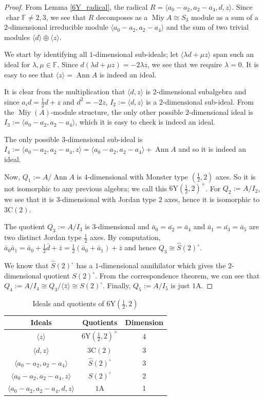 \documentclass[11pt, a4paper]{article}
\theoremstyle{plain}
\theoremstyle{definition}
\newcommand\lm{\lambda}
\newcommand\la{\langle}
\newcommand\ra{\rangle}
\DeclareMathOperator{\ch}{char}
\DeclareMathOperator{\Ann}{Ann}
\newcommand\FF{\mathbb{F}}
\newcommand{\A}{\mathrm{A}}
\newcommand{\C}{\mathrm{C}}
\newcommand{\Y}{\mathrm{Y}}
\DeclareMathOperator{\Miy}{Miy}
\newcommand{\0}{\overline{0}}
\newcommand{\2}{\overline{2}}
\newcommand{\1}{\mathbbm{1}}
\begin{document}
\begin{proof}
From Lemma \ref{6Y_radical}, the radical $R = \la a_0-a_2, a_2-a_4, d, z \ra$.  Since $\ch \FF \neq 2,3$, we see that $R$ decomposes as a $\Miy A \cong S_3$ module as a sum of a $2$-dimensional irreducible module $\la a_0-a_2, a_2- a_4 \ra$ and the sum of two trivial modules $\la d \ra \oplus \la z \ra$.
	
	We start by identifying all $1$-dimensional sub-ideals; let $\la \lm d + \mu z\ra$ span such an ideal for $\lm, \mu \in \FF$. Since $d(\lm d + \mu z) = -2\lm z$, we see that we require $\lm = 0$.  It is easy to see that $\la z \ra = \Ann A$ is indeed an ideal.
	
	It is clear from the multiplication that $\la d, z\ra$ is 2-dimensional subalgebra and since $a_i d = \tfrac{1}{2} d +z $ and $d^2 = -2z$, $I_2 := \la d, z\ra$ is a $2$-dimensional sub-ideal. From the $\Miy(A)$-module structure, the only other possible $2$-dimensional ideal is $I_3:=\la a_0-a_2, a_2-a_4 \ra$, which it is easy to check is indeed an ideal.

The only possible $3$-dimensional sub-ideal is $I_4:= \la a_0-a_2,a_2-a_4, z \ra = \la a_0 - a_2, a_2 - a_4 \ra + \Ann A$ and so it is indeed an ideal. 

Now, $Q_1 := A/ \Ann A$ is $4$-dimensional with Monster type $(\tfrac{1}{2},2)$ axes.  So it is not isomorphic to any previous algebra; we call this $6\Y(\frac{1}{2}, 2)^\times$.  For $Q_2:= A/I_2$, we see that it is $3$-dimensional with Jordan type $2$ axes, hence it is isomorphic to $3\C(2)$.

The quotient $Q_3:= A/I_3$ is $3$-dimensional and $\bar{a}_0 = \bar{a_2} = \bar{a}_4$ and $\bar{a}_1 = \bar{a_3} = \bar{a}_5$ are two distinct Jordan type $\frac{1}{2}$ axes.  By computation, $\bar{a}_0 \bar{a}_1 = \bar{a}_0 + \frac{1}{2} \bar{d} + \bar{z} = \frac{1}{2}(\bar{a}_0 + \bar{a}_1) + \bar{z}$ and hence $Q_3 \cong \widehat{S}(2)^\circ$.

We know that $\widehat{S}(2)^\circ$ has a $1$-dimensional annihilator which gives the $2$-dimensional quotient $S(2)^\circ$. From the correspondence theorem, we can see that $Q_4 := A/I_4 \cong  Q_3/\la \bar{z} \ra \cong S(2)^\circ$. 	Finally, $Q_5 := A/I_5$ is just $1\A$.
\end{proof}

\begin{table}[h!tb]
	\renewcommand{\arraystretch}{1.5}
	\centering
	\footnotesize
	\begin{tabular}{c|c|c}
		\hline
		 Ideals & Quotients & Dimension \\
		\hline
		    $\la z \ra$ &  $6\Y(\frac{1}{2}, 2)^\times$ & 4 \\
		    $\la d,z \ra$ &  $3\C(2)$ & 3 \\
		    $\la a_0-a_2,a_2-a_4 \ra$ &  $\widehat{S}(2)^\circ$ & 3 \\
		    $\la a_0-a_2,a_2-a_4, z \ra$ &  $S(2)^\circ$ & 2 \\
		    $\la a_0-a_2,a_2-a_4, d,z \ra$ &  $1\A$ & 1
	\end{tabular}
	\caption{Ideals and quotients of $6\Y(\frac{1}{2}, 2)$}\label{tab:6Yprops}
\end{table}
\end{document}
